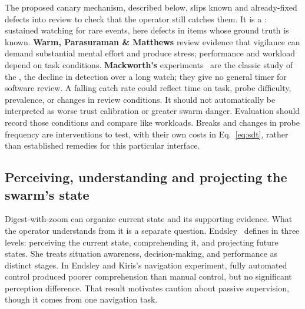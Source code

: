\documentclass[11pt,a4paper]{article}
\theoremstyle{definition}
\theoremstyle{plain}
\begin{document}
The proposed canary mechanism, described below, slips known and already-fixed
defects into review to check that the operator still catches them. It is a
: sustained watching for rare events, here defects in
items whose ground truth is known. \textbf{Warm, Parasuraman \&
Matthews} review evidence that vigilance can demand substantial
mental effort and produce stress; performance and workload depend on task
conditions. \textbf{Mackworth's} experiments~ are the
classic study of the , the decline in detection over
a long watch; they give no general timer for software review.
A falling catch rate could reflect time on task, probe difficulty, prevalence,
or changes in review conditions. It should not automatically be interpreted as
worse trust calibration or greater swarm danger. Evaluation should record those
conditions and compare like workloads. Breaks and changes in probe frequency are
interventions to test, with their own costs in Eq.~\ref{eq:sdt}, rather than
established remedies for this particular interface.


\pagebreak
\subsection{Perceiving, understanding and projecting the swarm's state}\label{sec:sa}

Digest-with-zoom can organize current state and its supporting evidence. What
the operator understands from it is a separate question. Endsley~
defines  in three levels: perceiving the current
state, comprehending it, and projecting future states. She treats situation
awareness, decision-making, and performance as distinct stages.
In Endsley and Kiris's navigation experiment,
fully automated control produced poorer comprehension than manual control, but
no significant perception difference. That result motivates caution about passive
supervision, though it comes from one navigation task.
\end{document}
